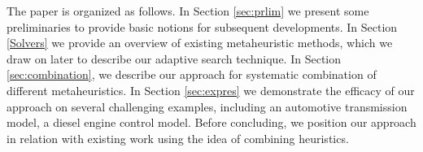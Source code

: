 The paper is organized as follows. In Section \ref{sec:prlim} we
present some preliminaries to provide basic notions for subsequent
developments. In Section \ref{Solvers} we provide an overview of
existing metaheuristic methods, which we draw on later to describe our
adaptive search technique.  In Section \ref{sec:combination}, we
describe our approach for systematic combination of different
metaheuristics. In Section \ref{sec:expres} we demonstrate the
efficacy of our approach on several challenging examples, including an
automotive transmission model, a diesel engine control model. Before
concluding, we position our approach in relation with existing work
using the idea of combining heuristics.
